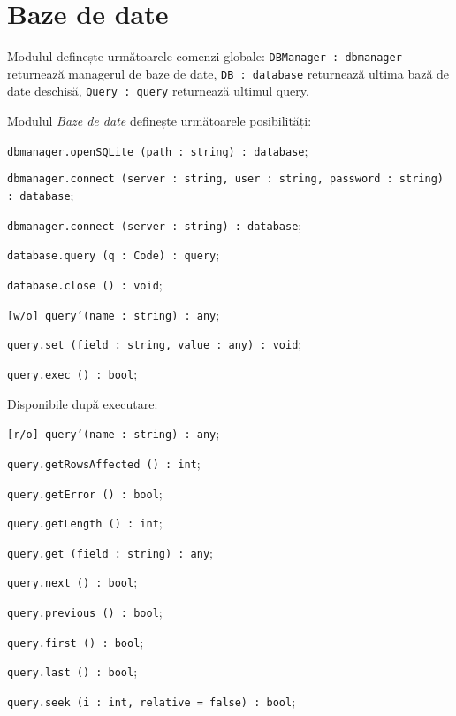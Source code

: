 \section{Baze de date}

Modulul definește următoarele comenzi globale: \texttt{DBManager : dbmanager} returnează managerul de baze de date, \texttt{DB : database} returnează ultima bază de date deschisă, \texttt{Query : query} returnează ultimul query.

Modulul \textit{Baze de date} definește următoarele posibilități:
\begin{icItems}
	\item \texttt{dbmanager.openSQLite (path : string) : database};
	\item \texttt{dbmanager.connect (server : string, user : string, password : string) : database};
	\item \texttt{dbmanager.connect (server : string) : database};
	\item \texttt{database.query (q : Code) : query};
	\item \texttt{database.close () : void};
	\item \texttt{[w/o] query'(name : string) : any};
	\item \texttt{query.set (field : string, value : any) : void};
	\item \texttt{query.exec () : bool};
	\item Disponibile după executare:
	\begin{icItems}
		\item \texttt{[r/o] query'(name : string) : any};
		\item \texttt{query.getRowsAffected () : int};
		\item \texttt{query.getError () : bool};
		\item \texttt{query.getLength () : int};
		\item \texttt{query.get (field : string) : any};
		\item \texttt{query.next () : bool};
		\item \texttt{query.previous () : bool};
		\item \texttt{query.first () : bool};
		\item \texttt{query.last () : bool};
		\item \texttt{query.seek (i : int, relative = false) : bool};
	\end{icItems}
\end{icItems}

